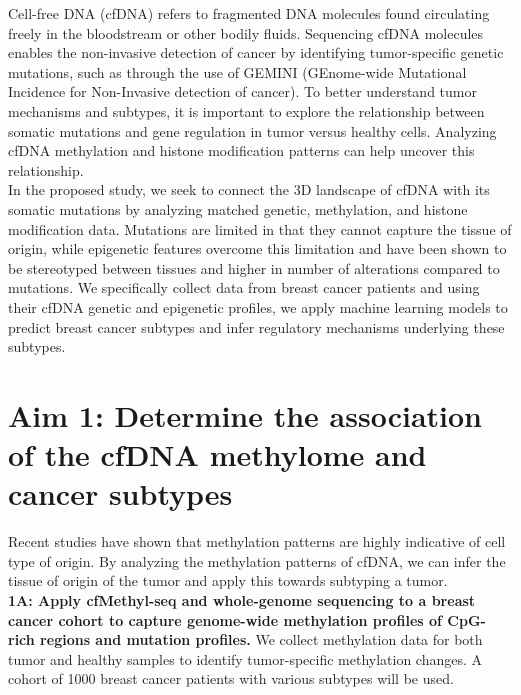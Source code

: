 \documentclass[11pt]{article}
\title{}
\author{}
\date{}
\begin{document}
\vspace{-1cm}

\noindent Cell-free DNA (cfDNA) refers to fragmented DNA molecules found circulating freely in the bloodstream or other bodily fluids. 
Sequencing cfDNA molecules enables the non-invasive detection of cancer by identifying tumor-specific genetic mutations, such as through the use of GEMINI (GEnome-wide Mutational Incidence for Non-Invasive detection of cancer). \cite{bruhm_single-molecule_2023}
To better understand tumor mechanisms and subtypes, it is important to explore the relationship between somatic mutations and gene regulation in tumor versus healthy cells. Analyzing cfDNA methylation and histone modification patterns can help uncover this relationship. \cite{penny_chromatin-_2024} \\
In the proposed study, we seek to connect the 3D landscape of cfDNA with its somatic mutations by analyzing matched genetic, methylation, and histone modification data. 
Mutations are limited in that they cannot capture the tissue of origin, while epigenetic features overcome this limitation and have been shown to be stereotyped between tissues and higher in number of alterations compared to mutations. \cite{penny_chromatin-_2024} 
We specifically collect data from breast cancer patients and using their cfDNA genetic and epigenetic profiles, we apply machine learning models to predict breast cancer subtypes and infer regulatory mechanisms underlying these subtypes.
\section*{Aim 1: Determine the association of the cfDNA methylome and cancer subtypes}
Recent studies have shown that methylation patterns are highly indicative of cell type of origin.\cite{spector_methylome_2023} 
By analyzing the methylation patterns of cfDNA, we can infer the tissue of origin of the tumor and apply this towards subtyping a tumor.
\medskip \\
\noindent \textbf{1A: Apply cfMethyl-seq \cite{stackpole_cost-effective_2022} and whole-genome sequencing to a breast cancer cohort to capture genome-wide methylation profiles of CpG-rich regions and mutation profiles.} We collect methylation data for both tumor and healthy samples to identify tumor-specific methylation changes. A cohort of 1000 breast cancer patients with various subtypes will be used. 
\end{document}
